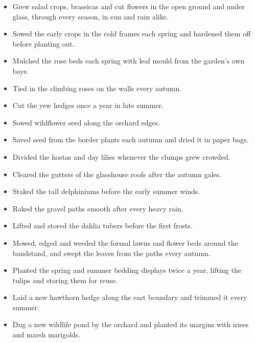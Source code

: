 \documentclass[11pt,a4paper,sans]{moderncv}
\begin{document}
{\small
\begin{itemize}
    \item Grew salad crops, brassicas and cut flowers in the open ground and under glass, through every season, in sun and rain alike.
    \item Sowed the early crops in the cold frames each spring and hardened them off before planting out.
    \item Mulched the rose beds each spring with leaf mould from the garden's own bays.
    \item Tied in the climbing roses on the walls every autumn.
    \item Cut the yew hedges once a year in late summer.
    \item Sowed wildflower seed along the orchard edges.
    \item Saved seed from the border plants each autumn and dried it in paper bags.
    \item Divided the hostas and day lilies whenever the clumps grew crowded.
    \item Cleared the gutters of the glasshouse roofs after the autumn gales.
    \item Staked the tall delphiniums before the early summer winds.
    \item Raked the gravel paths smooth after every heavy rain.
    \item Lifted and stored the dahlia tubers before the first frosts.
\end{itemize}\par}
\addvspace{.5em}

\vspace{3pt}

{\small
\begin{itemize}
    \item Mowed, edged and weeded the formal lawns and flower beds around the bandstand, and swept the leaves from the paths every autumn.
    \item Planted the spring and summer bedding displays twice a year, lifting the tulips and storing them for reuse.
    \item Laid a new hawthorn hedge along the east boundary and trimmed it every summer.
    \item Dug a new wildlife pond by the orchard and planted its margins with irises and marsh marigolds.
\end{itemize}\par}
\addvspace{.5em}
\end{document}
